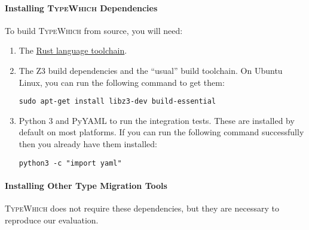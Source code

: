 \documentclass{book}
\newcommand{\system}{\textsc{TypeWhich}\xspace}
\begin{document}
\paragraph{Installing \system Dependencies}

To build \system from source, you will need:

\begin{enumerate}

\item The \href{https://rustup.rs/}{Rust language toolchain}.

\item The Z3 build dependencies and the ``usual'' build toolchain. On Ubuntu Linux, you can run the following
command to get them:

\begin{verbatim}
sudo apt-get install libz3-dev build-essential
\end{verbatim}

\item Python 3 and PyYAML to run the integration tests. These are installed by
default on most platforms. If you can run the following command successfully
then you already have them installed:
\begin{verbatim}
python3 -c "import yaml"
\end{verbatim}

\end{enumerate}

\paragraph{Installing Other Type Migration Tools}

\system does not require these dependencies, but they are necessary to reproduce
our evaluation.
\end{document}
